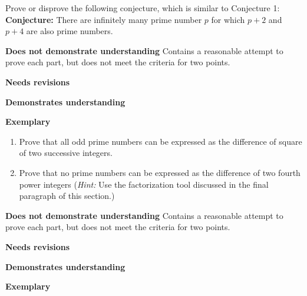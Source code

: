 \documentclass[letterpaper, 11pt]{../ximera}
\begin{document}
\begin{ex} Prove or disprove the following conjecture, which is similar to Conjecture 1:
		\textbf{Conjecture:} There are infinitely many prime number $p$ for which $p+2$ and $p+4$ are also prime numbers.
\end{ex}

\begin{writeRubric}
    \item \textbf{Does not demonstrate understanding}
     Contains a reasonable attempt to prove each part, but does not meet the criteria for two points.
    \item \textbf{Needs revisions}
     
    \item \textbf{Demonstrates understanding}
    
    \item \textbf{Exemplary}
        
\end{writeRubric}
                                       \begin{solution}
 
\end{solution}

\begin{ex} 
		 \begin{enumerate}[label=(\alph*)]
		 	\item Prove that all odd prime numbers can be expressed as the difference of square of two successive integers.
			\item Prove that no prime numbers can be expressed as the difference of two fourth power integers (\emph{Hint:} Use the factorization tool discussed in the final paragraph of this section.)
		\end{enumerate}
\end{ex}

\begin{writeRubric}
    \item \textbf{Does not demonstrate understanding}
     Contains a reasonable attempt to prove each part, but does not meet the criteria for two points.
    \item \textbf{Needs revisions}
     
    \item \textbf{Demonstrates understanding}
    
    \item \textbf{Exemplary}
        
\end{writeRubric}
                                       
\end{document}
